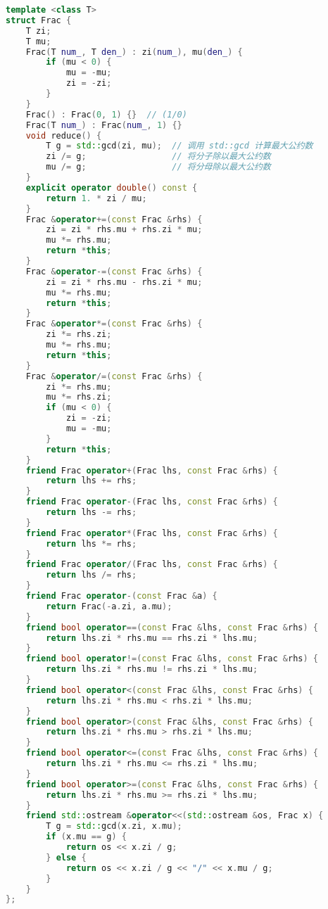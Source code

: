 \begin{lstlisting}[language=C++]
template <class T>
struct Frac {
    T zi;
    T mu;
    Frac(T num_, T den_) : zi(num_), mu(den_) {
        if (mu < 0) {
            mu = -mu;
            zi = -zi;
        }
    }
    Frac() : Frac(0, 1) {}  // (1/0)
    Frac(T num_) : Frac(num_, 1) {}
    void reduce() {
        T g = std::gcd(zi, mu);  // 调用 std::gcd 计算最大公约数
        zi /= g;                 // 将分子除以最大公约数
        mu /= g;                 // 将分母除以最大公约数
    }
    explicit operator double() const {
        return 1. * zi / mu;
    }
    Frac &operator+=(const Frac &rhs) {
        zi = zi * rhs.mu + rhs.zi * mu;
        mu *= rhs.mu;
        return *this;
    }
    Frac &operator-=(const Frac &rhs) {
        zi = zi * rhs.mu - rhs.zi * mu;
        mu *= rhs.mu;
        return *this;
    }
    Frac &operator*=(const Frac &rhs) {
        zi *= rhs.zi;
        mu *= rhs.mu;
        return *this;
    }
    Frac &operator/=(const Frac &rhs) {
        zi *= rhs.mu;
        mu *= rhs.zi;
        if (mu < 0) {
            zi = -zi;
            mu = -mu;
        }
        return *this;
    }
    friend Frac operator+(Frac lhs, const Frac &rhs) {
        return lhs += rhs;
    }
    friend Frac operator-(Frac lhs, const Frac &rhs) {
        return lhs -= rhs;
    }
    friend Frac operator*(Frac lhs, const Frac &rhs) {
        return lhs *= rhs;
    }
    friend Frac operator/(Frac lhs, const Frac &rhs) {
        return lhs /= rhs;
    }
    friend Frac operator-(const Frac &a) {
        return Frac(-a.zi, a.mu);
    }
    friend bool operator==(const Frac &lhs, const Frac &rhs) {
        return lhs.zi * rhs.mu == rhs.zi * lhs.mu;
    }
    friend bool operator!=(const Frac &lhs, const Frac &rhs) {
        return lhs.zi * rhs.mu != rhs.zi * lhs.mu;
    }
    friend bool operator<(const Frac &lhs, const Frac &rhs) {
        return lhs.zi * rhs.mu < rhs.zi * lhs.mu;
    }
    friend bool operator>(const Frac &lhs, const Frac &rhs) {
        return lhs.zi * rhs.mu > rhs.zi * lhs.mu;
    }
    friend bool operator<=(const Frac &lhs, const Frac &rhs) {
        return lhs.zi * rhs.mu <= rhs.zi * lhs.mu;
    }
    friend bool operator>=(const Frac &lhs, const Frac &rhs) {
        return lhs.zi * rhs.mu >= rhs.zi * lhs.mu;
    }
    friend std::ostream &operator<<(std::ostream &os, Frac x) {
        T g = std::gcd(x.zi, x.mu);
        if (x.mu == g) {
            return os << x.zi / g;
        } else {
            return os << x.zi / g << "/" << x.mu / g;
        }
    }
};
\end{lstlisting}
